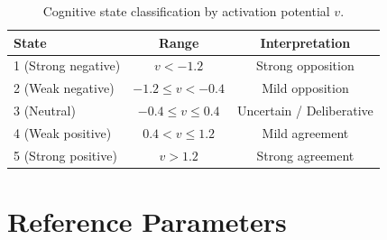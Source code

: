 ﻿\documentclass[11pt]{article}
\begin{document}
\begin{table}[ht]
\centering
\caption{Cognitive state classification by activation potential $v$.}
\label{tab:states}
\begin{tabular}{lcc}
\toprule
\textbf{State} & \textbf{Range} & \textbf{Interpretation} \\
\midrule
1 (Strong negative) & $v < -1.2$ & Strong opposition \\
2 (Weak negative)   & $-1.2 \leq v < -0.4$ & Mild opposition \\
3 (Neutral)         & $-0.4 \leq v \leq 0.4$ & Uncertain / Deliberative \\
4 (Weak positive)   & $0.4 < v \leq 1.2$ & Mild agreement \\
5 (Strong positive) & $v > 1.2$ & Strong agreement \\
\bottomrule
\end{tabular}
\end{table}

\section{Reference Parameters}
\label{app:parameters}
\end{document}
